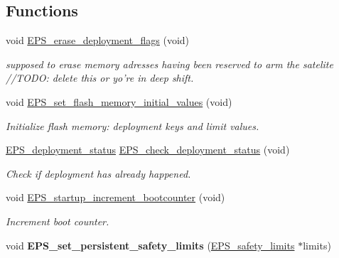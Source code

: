 \subsection*{Functions}
\begin{DoxyCompactItemize}
\item 
void \hyperlink{group__eps__non__volatile__mem__handling_ga29f3e5e83ec8294faabac0b45752b874}{E\-P\-S\-\_\-erase\-\_\-deployment\-\_\-flags} (void)
\begin{DoxyCompactList}\small\item\em supposed to erase memory adresses having been reserved to arm the satelite //\-T\-O\-D\-O\-: delete this or yo're in deep shift. \end{DoxyCompactList}\item 
void \hyperlink{group__eps__non__volatile__mem__handling_ga170dcc59327d986799c5fee8f3c68405}{E\-P\-S\-\_\-set\-\_\-flash\-\_\-memory\-\_\-initial\-\_\-values} (void)
\begin{DoxyCompactList}\small\item\em Initialize flash memory\-: deployment keys and limit values. \end{DoxyCompactList}\item 
\hyperlink{group__eps__non__volatile__mem__handling_ga13e6db4835e4559cf9c14fa16822ca27}{E\-P\-S\-\_\-deployment\-\_\-status} \hyperlink{group__eps__non__volatile__mem__handling_ga90e02d812490473196c35fe398ee00b9}{E\-P\-S\-\_\-check\-\_\-deployment\-\_\-status} (void)
\begin{DoxyCompactList}\small\item\em Check if deployment has already happened. \end{DoxyCompactList}\item 
void \hyperlink{group__eps__non__volatile__mem__handling_gaa511918f04841ecbe69a447259d1f267}{E\-P\-S\-\_\-startup\-\_\-increment\-\_\-bootcounter} (void)
\begin{DoxyCompactList}\small\item\em Increment boot counter. \end{DoxyCompactList}\item 
\hypertarget{group__eps__non__volatile__mem__handling_gaa8d864130b7018cac3f5efcdb5a59cfc}{void {\bfseries E\-P\-S\-\_\-set\-\_\-persistent\-\_\-safety\-\_\-limits} (\hyperlink{struct_e_p_s__safety__limits}{E\-P\-S\-\_\-safety\-\_\-limits} $\ast$limits)}\label{group__eps__non__volatile__mem__handling_gaa8d864130b7018cac3f5efcdb5a59cfc}


\end{DoxyCompactItemize}

